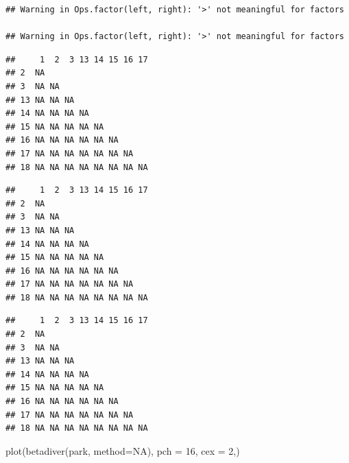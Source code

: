 \documentclass[
]{article}
\newenvironment{Shaded}{\begin{snugshade}}{\end{snugshade}}
\newcommand{\AttributeTok}[1]{\textcolor[rgb]{0.77,0.63,0.00}{#1}}
\newcommand{\CommentTok}[1]{\textcolor[rgb]{0.56,0.35,0.01}{\textit{#1}}}
\newcommand{\ConstantTok}[1]{\textcolor[rgb]{0.00,0.00,0.00}{#1}}
\newcommand{\DecValTok}[1]{\textcolor[rgb]{0.00,0.00,0.81}{#1}}
\newcommand{\FunctionTok}[1]{\textcolor[rgb]{0.00,0.00,0.00}{#1}}
\newcommand{\NormalTok}[1]{#1}
\newcommand{\SpecialCharTok}[1]{\textcolor[rgb]{0.00,0.00,0.00}{#1}}
\begin{document}
\begin{verbatim}
## Warning in Ops.factor(left, right): '>' not meaningful for factors

## Warning in Ops.factor(left, right): '>' not meaningful for factors
\end{verbatim}

\begin{Shaded}
\end{Shaded}

\begin{verbatim}
##     1  2  3 13 14 15 16 17
## 2  NA                     
## 3  NA NA                  
## 13 NA NA NA               
## 14 NA NA NA NA            
## 15 NA NA NA NA NA         
## 16 NA NA NA NA NA NA      
## 17 NA NA NA NA NA NA NA   
## 18 NA NA NA NA NA NA NA NA
\end{verbatim}

\begin{Shaded}
\end{Shaded}

\begin{verbatim}
##     1  2  3 13 14 15 16 17
## 2  NA                     
## 3  NA NA                  
## 13 NA NA NA               
## 14 NA NA NA NA            
## 15 NA NA NA NA NA         
## 16 NA NA NA NA NA NA      
## 17 NA NA NA NA NA NA NA   
## 18 NA NA NA NA NA NA NA NA
\end{verbatim}

\begin{Shaded}
\end{Shaded}

\begin{verbatim}
##     1  2  3 13 14 15 16 17
## 2  NA                     
## 3  NA NA                  
## 13 NA NA NA               
## 14 NA NA NA NA            
## 15 NA NA NA NA NA         
## 16 NA NA NA NA NA NA      
## 17 NA NA NA NA NA NA NA   
## 18 NA NA NA NA NA NA NA NA
\end{verbatim}

\begin{Shaded}
\begin{Highlighting}[]
\FunctionTok{plot}\NormalTok{(}\FunctionTok{betadiver}\NormalTok{(park, }\AttributeTok{method=}\ConstantTok{NA}\NormalTok{), }\AttributeTok{pch =} \DecValTok{16}\NormalTok{, }\AttributeTok{cex =} \DecValTok{2}\NormalTok{,)}
\end{Highlighting}
\end{Shaded}
\end{document}
